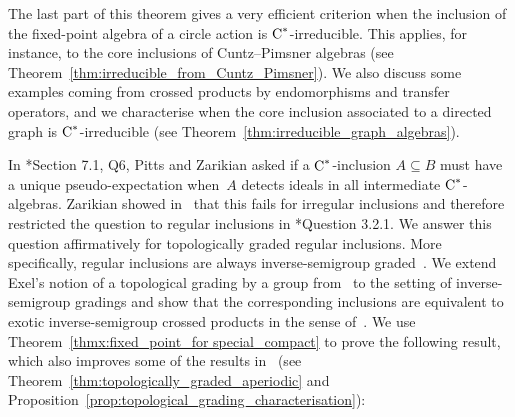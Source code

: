 \documentclass[a4paper]{amsart}
\theoremstyle{plain}
\theoremstyle{definition}
\theoremstyle{remark}
\numberwithin{theorem}{section}
\numberwithin{equation}{section}
\newcommand*{\nb}{\nobreakdash}
\newcommand*{\Cst}{\textup C^*}%
\begin{document}
The last part of this theorem gives a very efficient criterion when
the inclusion of the fixed-point algebra of a circle action is
\(\Cst\)\nb-irreducible.
This applies, for instance, to the core inclusions of Cuntz--Pimsner
algebras (see Theorem~\ref{thm:irreducible_from_Cuntz_Pimsner}).
We also discuss some examples coming from crossed products by
endomorphisms and transfer operators, and we characterise when the
core inclusion associated to a directed graph is
\(\Cst\)\nb-irreducible (see
Theorem~\ref{thm:irreducible_graph_algebras}).

In \cite{Pitts-Zarikian:Unique_pseudoexpectation}*{Section 7.1, Q6},
Pitts and Zarikian asked if a \(\Cst\)\nb-inclusion \(A\subseteq B\)
must have a unique pseudo-expectation when~\(A\) detects ideals in all
intermediate \(\Cst\)\nb-algebras.
Zarikian showed in~\cite{Zarikian:Unique_pseudo} that this fails for
irregular inclusions and therefore restricted the question to regular
inclusions in \cite{Zarikian:Unique_pseudo}*{Question 3.2.1}.
We answer this question affirmatively for topologically graded regular
inclusions.
More specifically, regular inclusions are always inverse-semigroup
graded~\cite{Kwasniewski-Meyer:Stone_duality}.
We extend Exel's notion of a topological grading by a group
from~\cite{Exel:Partial_dynamical} to the setting of inverse-semigroup
gradings and show that the corresponding inclusions are equivalent to
exotic inverse-semigroup crossed products in the sense
of~\cite{Kwasniewski-Meyer:Essential}.
We use Theorem~\ref{thmx:fixed_point_for special_compact} to prove the
following result, which also improves some of the results
in~\cite{Kwasniewski-Meyer:Aperiodicity_pseudo_expectations} (see
Theorem~\ref{thm:topologically_graded_aperiodic} and
Proposition~\ref{prop:topological_grading_characterisation}):
\end{document}
